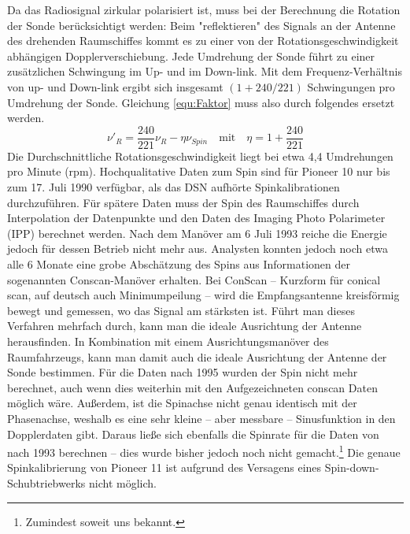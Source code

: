 Da das Radiosignal zirkular polarisiert ist, muss bei der Berechnung die Rotation der Sonde berücksichtigt werden: Beim "reflektieren" des Signals an der Antenne des drehenden Raumschiffes kommt es zu einer von der Rotationsgeschwindigkeit abhängigen Dopplerverschiebung. Jede Umdrehung der Sonde führt zu einer zusätzlichen Schwingung im Up- und im Down-link. Mit dem Frequenz-Verhältnis von up- und Down-link ergibt sich insgesamt $(1+240/221)$ Schwingungen pro Umdrehung der Sonde.\cite{Anderson2002} %
Gleichung \ref{equ:Faktor} muss also durch folgendes ersetzt werden.
\begin{equation}
\nu'_R = \frac{240}{221}\nu_R - \eta\nu_{Spin} \quad \mathrm{mit}  \quad \eta = 1+ \frac{240}{221}
\end{equation}
Die Durchschnittliche Rotationsgeschwindigkeit liegt bei etwa 4,4 Umdrehungen pro Minute (rpm).\cite{Markwardt2002}
Hochqualitative Daten zum Spin sind für Pioneer 10 nur bis zum 17. Juli 1990 verfügbar, als das DSN aufhörte Spinkalibrationen durchzuführen. Für spätere Daten muss der Spin des Raumschiffes durch Interpolation der Datenpunkte und den Daten des Imaging Photo Polarimeter (IPP) berechnet werden. Nach dem Manöver am 6 Juli 1993 reiche die Energie jedoch für dessen Betrieb nicht mehr aus. Analysten konnten jedoch noch etwa alle 6 Monate eine grobe Abschätzung des Spins aus Informationen der sogenannten Conscan-Manöver erhalten. %
Bei ConScan – Kurzform für conical scan, auf deutsch auch Minimumpeilung – wird die Empfangsantenne kreisförmig bewegt und gemessen, wo das Signal am stärksten ist. Führt man dieses Verfahren mehrfach durch, kann man die ideale Ausrichtung der Antenne herausfinden. In Kombination mit einem Ausrichtungsmanöver des Raumfahrzeugs, kann man damit auch die ideale Ausrichtung der Antenne der Sonde bestimmen.\cite{Anderson2002}
Für die Daten nach 1995 wurden der Spin nicht mehr berechnet, auch wenn dies weiterhin mit den Aufgezeichneten conscan Daten möglich wäre. Außerdem, ist die Spinachse nicht genau identisch mit der Phasenachse, weshalb es eine sehr kleine – aber messbare – Sinusfunktion in den Dopplerdaten gibt. Daraus ließe sich ebenfalls die Spinrate für die Daten von nach 1993 berechnen – dies wurde bisher jedoch noch nicht gemacht.\footnote{Zumindest soweit uns bekannt.}
Die genaue Spinkalibrierung von Pioneer 11 ist aufgrund des Versagens eines Spin-down-Schubtriebwerks nicht möglich.\cite{Anderson2002}


